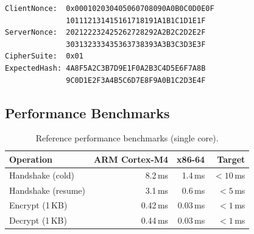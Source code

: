 \documentclass[
    language=english,
    doctype=article,
    institution=none,
]{../../omnilatex}
\begin{document}
\begin{verbatim}
ClientNonce:  0x000102030405060708090A0B0C0D0E0F
              101112131415161718191A1B1C1D1E1F
ServerNonce:  202122232425262728292A2B2C2D2E2F
              303132333435363738393A3B3C3D3E3F
CipherSuite:  0x01
ExpectedHash: 4A8F5A2C3B7D9E1F0A2B3C4D5E6F7A8B
              9C0D1E2F3A4B5C6D7E8F9A0B1C2D3E4F
\end{verbatim}

\subsection{Performance Benchmarks}

\begin{table}[htbp]
    \centering
    \caption{Reference performance benchmarks (single core).}
    \label{tab:perf}
    \begin{tabular}{@{}lrrr@{}}
        \toprule
        \textbf{Operation} & \textbf{ARM Cortex-M4} & \textbf{x86-64} &
            \textbf{Target} \\
        \midrule
        Handshake (cold)   & 8.2\,ms   & 1.4\,ms  & $< 10$\,ms \\
        Handshake (resume) & 3.1\,ms   & 0.6\,ms  & $< 5$\,ms  \\
        Encrypt (1\,KB)    & 0.42\,ms  & 0.03\,ms & $< 1$\,ms  \\
        Decrypt (1\,KB)    & 0.44\,ms  & 0.03\,ms & $< 1$\,ms  \\
        \bottomrule
    \end{tabular}
\end{table}

\printbibliography[heading=none]
\end{document}
